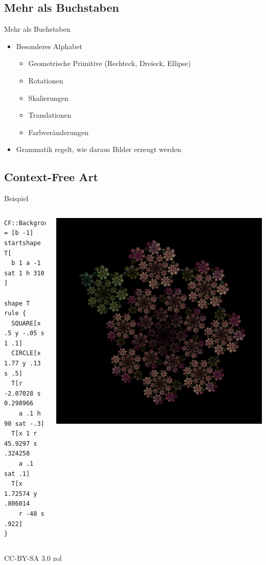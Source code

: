 \documentclass{beamer}
\theoremstyle{example}
\begin{document}
\subsection{Mehr als Buchstaben}
\begin{frame}{Mehr als Buchstaben}
  \begin{itemize}
  \item Besonderes Alphabet
    \begin{itemize}
    \item Geometrische Primitive (Rechteck, Dreieck, Ellipse)
    \item Rotationen
    \item Skalierungen
    \item Translationen
    \item Farbveränderungen
    \end{itemize}
  \item Grammatik regelt, wie daraus Bilder erzeugt werden
  \end{itemize}
\end{frame}

\subsection{Context-Free Art}
\begin{frame}[fragile]{Beispiel}
\begin{columns}
\column{4cm}
\footnotesize{
\begin{lstlisting}
CF::Background = [b -1]
startshape T[
  b 1 a -1 sat 1 h 310
]

shape T
rule {
  SQUARE[x .5 y -.05 s 1 .1]
  CIRCLE[x 1.77 y .13 s .5]
  T[r -2.07028 s 0.298966
    a .1 h 90 sat -.3]
  T[x 1 r 45.9297 s .324258
    a .1 sat .1]
  T[x 1.72574 y .806014
    r -48 s .922]
} 
\end{lstlisting}
}
\column{6cm}
\hfill\includegraphics[width=\linewidth]{./images/beispiel.png}
\end{columns}
\tiny
\hfill CC-BY-SA 3.0 zol
\end{frame}
\end{document}
